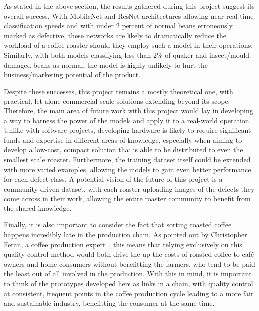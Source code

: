 As stated in the above section, the results gathered during this project suggest its overall success.
With MobileNet and ResNet architectures allowing near real-time classification speeds and with under 2 percent of normal beans
erroneously marked as defective, these networks are likely to dramatically reduce the workload of a coffee roaster should they employ such
a model in their operations.
Similarly, with both models classifying less than 2\% of quaker and insect/mould damaged beans as normal,
the model is highly unlikely to hurt the business/marketing potential of the product.

Despite these successes, this project remains a mostly theoretical one, with practical, let alone commercial-scale solutions
extending beyond its scope.
Therefore, the main area of future work with this project would lay in developing a way to harness the power of the models
and apply it to a real-world operation.
Unlike with software projects, developing hardware is likely to require significant funds and expertise in different areas of knowledge,
especially when aiming to develop a low-cost, compact solution that is able to be distributed to even the smallest scale roaster.
Furthermore, the training dataset itself could be extended with more varied examples, allowing the models to gain even better
performance for each defect class.
A potential vision of the future of this project is a community-driven dataset, with each roaster uploading images of the defects
they come across in their work, allowing the entire roaster community to benefit from the shared knowledge.

Finally, it is also important to consider the fact that sorting roasted coffee happens incredibly late in the production chain.
As pointed out by Christopher Feran, a coffee production expert~\cite{ferranCoffeeEthics}, this means that relying exclusively on
this quality control method would both drive the up the costs of roasted coffee to café owners and home consumers without benefitting the
farmers, who tend to be paid the least out of all involved in the production.
With this in mind, it is important to think of the prototypes developed here as links in a chain, with quality control at
consistent, frequent points in the coffee production cycle leading to a more fair and sustainable industry, benefitting the
consumer at the same time.